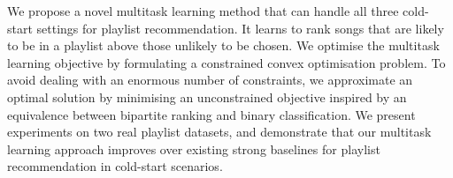We propose a novel multitask learning method that %
can handle
all three cold-start settings for playlist recommendation.
It learns to rank songs that are likely to be in a playlist %
above those unlikely to be chosen. %
%
We optimise the multitask learning objective by formulating %
a constrained convex optimisation problem.
To avoid dealing with an enormous number of constraints,
we approximate an optimal solution %
by minimising an unconstrained objective 
inspired by an equivalence %
between bipartite ranking and binary classification.
%
%
We present experiments on two real playlist datasets, %
and demonstrate that our multitask learning approach improves over existing strong baselines 
for playlist recommendation in cold-start scenarios.
%
%
%
